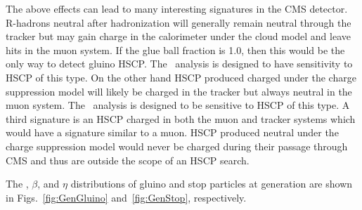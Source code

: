 The above effects can lead to many interesting signatures in the CMS detector. R-hadrons neutral after hadronization will generally remain neutral through the tracker
but may gain charge in the calorimeter under the cloud model and leave hits in the muon system. If the glue ball fraction is 1.0, then this would
be the only way to detect gluino HSCP. The \muononly\ analysis is designed to have sensitivity to HSCP of this type. On the other hand HSCP produced charged under
the charge suppression model will likely be charged in the tracker but always neutral in the muon system. The \tkonly\ analysis is designed to be sensitive
to HSCP of this type. A third signature is an HSCP charged in both the muon and tracker systems which would have a signature similar to a muon.
HSCP produced neutral under the charge suppression model would never be charged during their passage through CMS and thus are outside the scope
of an HSCP search.%

The \pt, $\beta$, and $\eta$ distributions of gluino and stop particles at generation are shown in Figs.~\ref{fig:GenGluino} and~\ref{fig:GenStop}, respectively.

